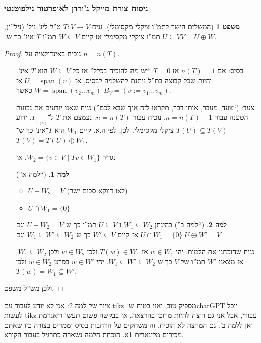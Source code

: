 \documentclass[a4paper]{article}
\DeclareMathOperator{\Sp}      {span}
\newcommand\co        {\colon}
\theoremstyle{definition}
\newtheorem{Theorem}{משפט}
\newtheorem{Lemma}{למה}
\newcommand\lem   [1] {\begin{Lemma}#1\end{Lemma}}
\begin{document}
	\subsubsection{ניסוח צורת מייקל ג'ורדן לאופרטור נילפוטנטי}
	\begin{Theorem}[המשלים הישר לתמ''ו ציקלי מקסימלי]
		נניח $T \co V \to V$ ט''ל לינ' ניל' (ניל''י), $U \subseteq V$ תמ''ו ציקלי מקסימלי אז קיים $W \subseteq V$ תמ''ו $T$־אינ' כך ש־$V = U \oplus W$. 
	\end{Theorem}
	\begin{proof}
		נוכיח באינדוקציה על $n = n(T)$. 
		\begin{itemize}
			\item[בסיס: ]אם $n(T) = 1$ אז $T = 0$ ``יש מה להוכיח בכלל'' אז כל $W \subseteq V$ הוא $T$־אינ'. והיות שכל קבוצה בת''ל ניתנת להשלמה לבסיס, אז $U = \Sp(v)$ אז $W = \Sp(v_2 \dots v_m)$ כאשר $B_V = (v := v_1 \dots v_m)$. 
			\item[צעד: ](``צעד, מעבר, אותו דבר, תקראו לזה איך שבא לכם'') נניח שאנו יודעים את נכונות הטענה עבור $n = n(T) - 1$. נוכיח עבור $n = n(T)$. נצמצם את $T$ ל־$T_{|_{T(V)}}$. ידוע $T(U) \subseteq T(V)$ ציקלי מקסימלי. לכן, לפי ה.א. קיים $W_1$ הוא $T$־אינ' כך ש־$T(V) = T(U) \oplus W_1$. 
			
			נגדיר $W_2 = \{v \in V \mid Tv \in W_1\}$. אז \lem{(``למה א'')
				\begin{itemize}
					\item $U + W_2 = V$ (לאו דווקא סכום ישר)
					\item $U \cap W_1 = \{0\}$
				\end{itemize}
			}
			\lem{(``למה ב'') בהינתן $W_1 \subseteq W_2$ ו־$U \subseteq V$ תמ''ו כך ש־$U + W_2 = V$ וגם $U \cap W_1 = \{0\}$ אז קיים $W' \subseteq V$ כך ש־$W_1 \subseteq W' \subseteq W_2$ וגם $U \oplus W' = V$} 
			
			נניח שהוכחנו את הלמות. יהי $w \in W_1$ אז $T(w) \in W_1$ ולכן $w \in W_2$ ולכן $W_1 \subseteq W_2$.          
			אז מצאנו $W'$ תמ''ו של $V$ כך ש־$W_1 \subseteq W' \subseteq W_2$. יהי $w \in W'$ בפרט $w \in W_2$ ולכן $T(w) = W_1 \subseteq W'$. 
		\end{itemize}
		ולכן מש''ל משפט. 
	\end{proof}
	
	ציור של למה 2: אני לא יודע לעבוד עם tikz מספיק טוב, ואני בטוח ש־chatGPT יוכל לעשות tikz עבורי, אבל אני גם רוצה להיות מרוכז בהרצאה. אז בבקשה פשוט תעשו דיאגרמת ואן ללמה ב'. גם המרצה לא הוכיח, זה משחקים על הרחבות בסיס וממדים בצורה כזו שאתם מכירים מלינארית 1א. הוכחת הלמה נשארה כתרגיל בעבור הקורא. %
	
\end{document}
